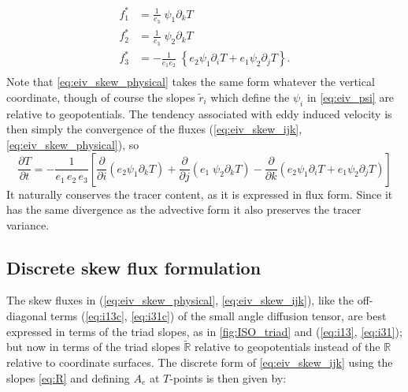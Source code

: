 \documentclass[../tex_main/NEMO_manual]{subfiles}
\begin{document}
\begin{equation}\label{eq:eiv_skew_physical}
\begin{split}
 f^*_1 & = \frac{1}{e_{3}}\; \psi_1 \partial_k T   \\
 f^*_2 & = \frac{1}{e_{3}}\; \psi_2 \partial_k T   \\
 f^*_3 & =  -\frac{1}{e_{1}e_{2}}\; \left\{ e_{2} \psi_1 \partial_i T
   + e_{1} \psi_2 \partial_j T \right\}. \\
\end{split}
\end{equation}
Note that  \autoref{eq:eiv_skew_physical} takes the same form whatever the
vertical coordinate, though of course the slopes
$\tilde{r}_i$ which define the $\psi_i$ in \autoref{eq:eiv_psi} are relative to geopotentials.
The tendency associated with eddy induced velocity is then simply the convergence
of the fluxes (\autoref{eq:eiv_skew_ijk}, \autoref{eq:eiv_skew_physical}), so
\begin{equation} \label{eq:skew_eiv_conv}
\frac{\partial T}{\partial t}= -\frac{1}{e_1 \, e_2 \, e_3 }      \left[
  \frac{\partial}{\partial i} \left( e_2 \psi_1 \partial_k T\right)
  + \frac{\partial}{\partial j} \left( e_1  \;
    \psi_2 \partial_k T\right)
 -  \frac{\partial}{\partial k} \left( e_{2} \psi_1 \partial_i T
   + e_{1} \psi_2 \partial_j T \right)  \right]
\end{equation}
 It naturally conserves the tracer content, as it is expressed in flux
 form. Since it has the same divergence as the advective form it also
 preserves the tracer variance.

\subsection{Discrete skew flux formulation}
The skew fluxes in (\autoref{eq:eiv_skew_physical}, \autoref{eq:eiv_skew_ijk}), like the off-diagonal terms
(\autoref{eq:i13c}, \autoref{eq:i31c}) of the small angle diffusion tensor, are best
expressed in terms of the triad slopes, as in \autoref{fig:ISO_triad}
and (\autoref{eq:i13}, \autoref{eq:i31}); but now in terms of the triad slopes
$\tilde{\mathbb{R}}$ relative to geopotentials instead of the
$\mathbb{R}$ relative to coordinate surfaces. The discrete form of
\autoref{eq:eiv_skew_ijk} using the slopes \autoref{eq:R} and
defining $A_e$ at $T$-points is then given by:
\end{document}

